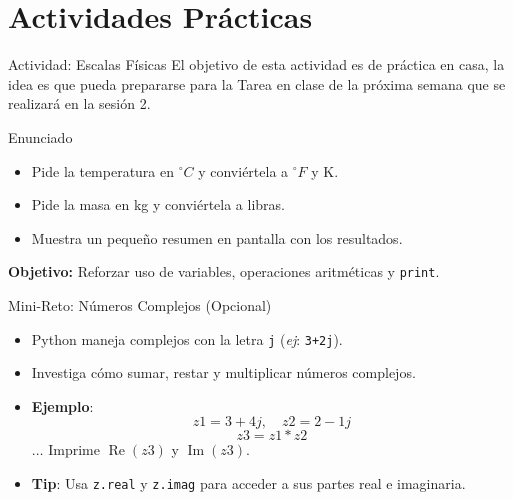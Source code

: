 \documentclass[10pt]{beamer}
\begin{document}
\section{Actividades Prácticas}

\begin{frame}{Actividad: Escalas Físicas}
  El objetivo de esta actividad es de práctica en casa, la idea es que pueda prepararse para la Tarea en clase de la próxima semana que se realizará en la sesión 2.
  \begin{block}{Enunciado}
    \begin{itemize}
      \item Pide la temperatura en \(^\circ C\) y conviértela a \(^\circ F\) y K.
      \item Pide la masa en kg y conviértela a libras.
      \item Muestra un pequeño resumen en pantalla con los resultados.
    \end{itemize}
  \end{block}
  \textbf{Objetivo:} Reforzar uso de variables, operaciones aritméticas y \texttt{print}.
\end{frame}

\begin{frame}{Mini-Reto: Números Complejos (Opcional)}
  \begin{itemize}
    \item Python maneja complejos con la letra \texttt{j} (\emph{ej}: \texttt{3+2j}).
    \item Investiga cómo sumar, restar y multiplicar números complejos.
    \item \textbf{Ejemplo}:
      \[
        z1 = 3 + 4j, \quad z2 = 2 - 1j
      \]
      \[
        z3 = z1 * z2
      \]
      \(\dots\) Imprime \(\operatorname{Re}(z3)\) y \(\operatorname{Im}(z3)\).
    \item \textbf{Tip}: Usa \texttt{z.real} y \texttt{z.imag} para acceder a sus partes real e imaginaria.
  \end{itemize}
\end{frame}
\end{document}

